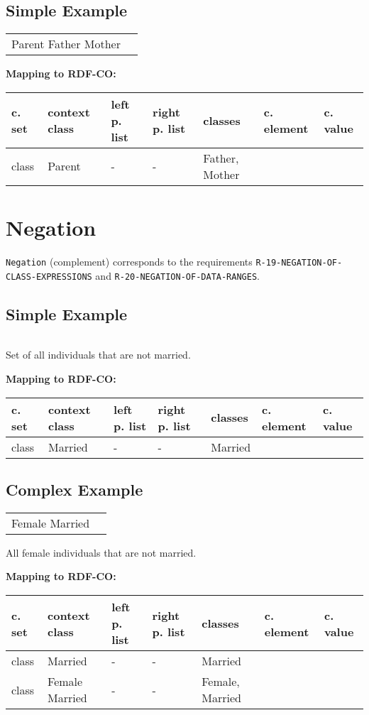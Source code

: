 \documentclass{llncs}
\newcommand{\ms}[1]{\texttt{#1}}
\newenvironment{gcotable}{
  \scriptsize
  \sffamily
  \vspace{0cm}
	\begin{center}
	\textbf{\vspace{0.4cm}Mapping to RDF-CO:} \\
  \begin{tabular}{l|l|l|l|l|l|l}
	\hline
  \textbf{c. set} & \textbf{context class} & \textbf{left p. list} & \textbf{right p. list} & \textbf{classes} & \textbf{c. element} & \textbf{c. value} \\
  \hline

}{
  \hline
  \end{tabular}
	\end{center}
}
\newenvironment{DL}{
\vspace{0cm}
	\begin{center}
  \begin{tabular}{r l}

}{
  \end{tabular}
	\end{center}
}
\begin{document}
\subsection{Simple Example}

\begin{DL}
Parent  Father  Mother
\end{DL}

\begin{gcotable}
class & Parent & - & - & Father, Mother &  \\
\end{gcotable}

\section{Negation}

\ms{Negation} (complement) corresponds to the requirements \ms{R-19-NEGATION-OF-} \ms{CLASS-EXPRESSIONS} and \ms{R-20-NEGATION-OF-DATA-RANGES}.

\subsection{Simple Example}

\begin{DL}
 \\ 
\end{DL}

Set of all individuals that are not married.

\begin{gcotable}
class &  Married & - & - & Married &  \\
\end{gcotable}

\subsection{Complex Example}

\begin{DL}
Female   Married \\
\end{DL}

All female individuals that are not married.

\begin{gcotable}
class &  Married & - & - & Married &  \\
class & Female   Married & - & - & Female,  Married &  \\
\end{gcotable}
\end{document}

